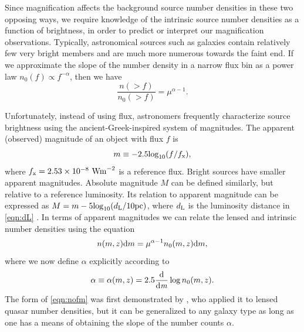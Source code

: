 Since magnification affects the background source number densities in these two opposing ways, we require knowledge of the intrinsic source number densities as a function of brightness, in order to predict or interpret our magnification observations. Typically, astronomical sources such as galaxies contain relatively few very bright members and are much more numerous towards the faint end. If we approximate the slope of the number density in a narrow flux bin as a power law $n_0(f) \propto f^{-\alpha}$, then we have
\begin{equation}
\frac{n(>f)}{n_0(>f)} = \mu^{\alpha-1}.
\end{equation}

Unfortunately, instead of using flux, astronomers frequently characterize source brightness using the ancient-Greek-inspired system of magnitudes. The apparent (observed) magnitude of an object with flux $f$ is
\begin{equation}
m \equiv -2.5 {\rm log}_{10}(f/f_{\rm x}),
\end{equation}
where $f_{\rm x} = 2.53 \times 10^{-8} \ {\rm W m}^{-2}$ is a reference flux. Bright sources have smaller apparent magnitudes. Absolute magnitude $M$ can be defined similarly, but relative to a reference luminosity. Its relation to apparent magnitude can be expressed as $M=m-5{\rm log}_{10}(d_{\rm L}/10{\rm pc})$, where $d_{\rm L}$ is the luminosity distance in \autoref{eqn:dL} \citep{RydenText}. In terms of apparent magnitudes we can relate the lensed and intrinsic number densities using the equation
\begin{equation}
\label{eqn:nofm}
n(m,z){\rm d}m = \mu^{\alpha -1} n_0(m,z){\rm d}m,
\end{equation}
where we now define $\alpha$ explicitly according to
\begin{equation}
\alpha \equiv \alpha(m,z) = 2.5 \frac{\mathrm d}{\mathrm d \it m} \log n_0(m,z).
\label{alpha}
\end{equation}
The form of \autoref{eqn:nofm} was first demonstrated by \citet{Narayan89}, who applied it to lensed quasar number densities, but it can be generalized to any galaxy type as long as one has a means of obtaining the slope of the number counts $\alpha$.

